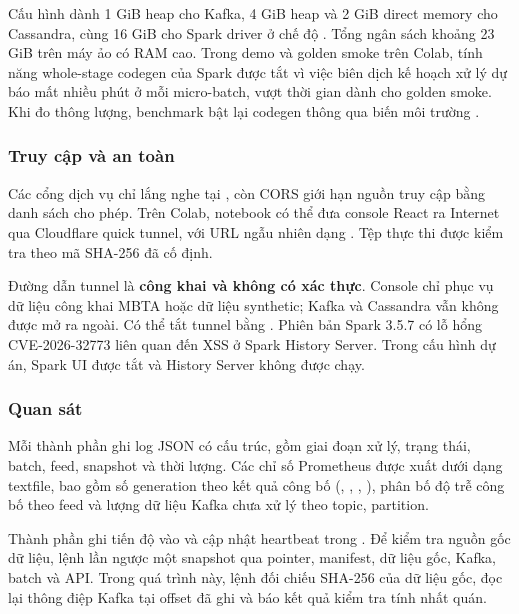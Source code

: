 Cấu hình  dành 1 GiB heap cho Kafka, 4 GiB heap và 2 GiB direct memory cho Cassandra, cùng 16 GiB cho Spark driver ở chế độ . Tổng ngân sách khoảng 23 GiB trên máy ảo có RAM cao. Trong demo và golden smoke trên Colab, tính năng whole-stage codegen của Spark được tắt vì việc biên dịch kế hoạch xử lý dự báo mất nhiều phút ở mỗi micro-batch, vượt thời gian dành cho golden smoke. Khi đo thông lượng, benchmark bật lại codegen thông qua biến môi trường .

\subsubsection{Truy cập và an toàn}

Các cổng dịch vụ chỉ lắng nghe tại , còn CORS giới hạn nguồn truy cập bằng danh sách cho phép. Trên Colab, notebook có thể đưa console React ra Internet qua Cloudflare quick tunnel, với URL ngẫu nhiên dạng . Tệp thực thi  được kiểm tra theo mã SHA-256 đã cố định.

Đường dẫn tunnel là \textbf{công khai và không có xác thực}. Console chỉ phục vụ dữ liệu công khai MBTA hoặc dữ liệu synthetic; Kafka và Cassandra vẫn không được mở ra ngoài. Có thể tắt tunnel bằng . Phiên bản Spark 3.5.7 có lỗ hổng CVE-2026-32773 liên quan đến XSS ở Spark History Server. Trong cấu hình dự án, Spark UI được tắt và History Server không được chạy.

\subsubsection{Quan sát}

Mỗi thành phần ghi log JSON có cấu trúc, gồm giai đoạn xử lý, trạng thái, batch, feed, snapshot và thời lượng. Các chỉ số Prometheus được xuất dưới dạng textfile, bao gồm số generation theo kết quả công bố (, , , ), phân bố độ trễ công bố theo feed và lượng dữ liệu Kafka chưa xử lý theo topic, partition.

Thành phần  ghi tiến độ vào  và cập nhật heartbeat trong . Để kiểm tra nguồn gốc dữ liệu, lệnh  lần ngược một snapshot qua pointer, manifest, dữ liệu gốc, Kafka, batch và API. Trong quá trình này, lệnh đối chiếu SHA-256 của dữ liệu gốc, đọc lại thông điệp Kafka tại offset đã ghi và báo kết quả kiểm tra tính nhất quán.
